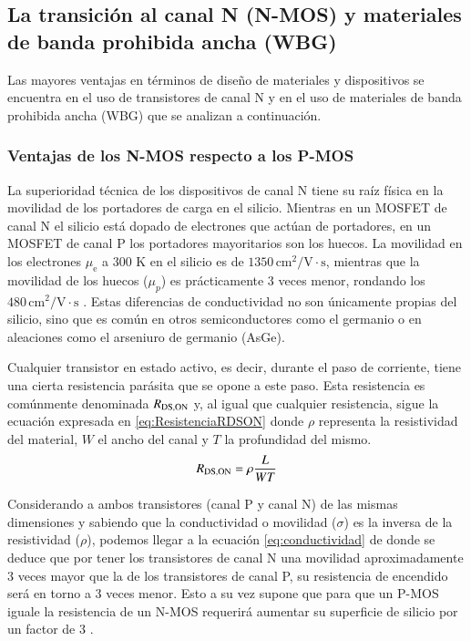 \documentclass[12pt]{report} %
\begin{document}
\subsection{La transición al canal N (N-MOS) y materiales de banda prohibida ancha (WBG)}
Las mayores ventajas en términos de diseño de materiales y dispositivos se encuentra en el uso de transistores de canal N y en el uso de materiales de banda prohibida ancha (WBG) que se analizan a continuación.
\subsubsection{Ventajas de los N-MOS respecto a los P-MOS}
La superioridad técnica de los dispositivos de canal N tiene su raíz física en la movilidad de los portadores de carga en el silicio. Mientras en un MOSFET de canal N el silicio está dopado de electrones que actúan de portadores, en un MOSFET de canal P los portadores mayoritarios son los huecos. 
La movilidad en los electrones $\mu_\text{e}$ a $300$ K en el silicio es de $1350 \, \text{cm}^2/\text{V}\cdot\text{s}$, mientras que la movilidad de los huecos ($\mu_p$) es prácticamente 3 veces menor, rondando los $480 \, \text{cm}^2/\text{V}\cdot\text{s}$ \cite{departamento_de_ingenieria_universidad_de_almeria_propiedades_nodate}. Estas diferencias de conductividad no son únicamente propias del silicio, sino que es común en otros semiconductores como el germanio o en aleaciones como el arseniuro de germanio (AsGe). 

Cualquier transistor en estado activo, es decir, durante el paso de corriente, tiene una cierta resistencia parásita que se opone a este paso. Esta resistencia es comúnmente denominada $R_{\text{DS,ON}}$ y, al igual que cualquier resistencia, sigue la ecuación expresada en \ref{eq:ResistenciaRDSON} donde $\rho$ representa la resistividad del material, $W$ el ancho del canal y $T$ la profundidad del mismo. 
\begin{equation}
	R_{\text{DS,ON}} = \rho \frac{L}{W T}
\label{eq:ResistenciaRDSON}
\end{equation}

Considerando a ambos transistores (canal P y canal N) de las mismas dimensiones y sabiendo que la conductividad o movilidad ($\sigma$) es la inversa de la resistividad ($\rho$), podemos llegar a la ecuación \ref{eq:conductividad} de donde se deduce que por tener los transistores de canal N una movilidad aproximadamente 3 veces mayor que la de los transistores de canal P, su resistencia de encendido será en torno a 3 veces menor. Esto a su vez supone que para que un P-MOS iguale la resistencia de un N-MOS requerirá aumentar su superficie de silicio por un factor de 3 \cite{noauthor_p-channel-power-mosfets-and-their-impactful-applications_nodate}.
\end{document}
